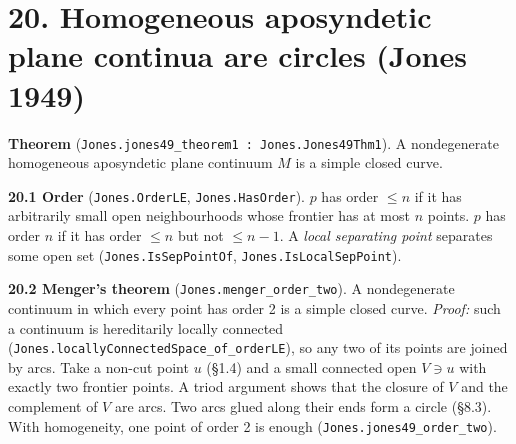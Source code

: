 \documentclass[11pt]{article}
\newcommand{\lean}[1]{\texttt{#1}}
\begin{document}
\section*{20. Homogeneous aposyndetic plane continua are circles (Jones 1949)}

\textbf{Theorem} (\lean{Jones.\hspace{0pt}jones49\_\hspace{0pt}theorem1 : Jones.\hspace{0pt}Jones49Thm1}). A nondegenerate homogeneous aposyndetic plane continuum $M$ is a simple closed curve.

\textbf{20.1 Order} (\lean{Jones.\hspace{0pt}OrderLE}, \lean{Jones.\hspace{0pt}HasOrder}). $p$ has order $\leq n$ if it has arbitrarily small open neighbourhoods whose frontier has at most $n$ points. $p$ has order $n$ if it has order $\leq n$ but not $\leq n - 1$. A \emph{local separating point} separates some open set (\lean{Jones.\hspace{0pt}IsSepPointOf}, \lean{Jones.\hspace{0pt}IsLocalSepPoint}).

\textbf{20.2 Menger's theorem} (\lean{Jones.\hspace{0pt}menger\_\hspace{0pt}order\_\hspace{0pt}two}). A nondegenerate continuum in which every point has order 2 is a simple closed curve. \emph{Proof:} such a continuum is hereditarily locally connected (\lean{Jones.\hspace{0pt}locallyConnectedSpace\_\hspace{0pt}of\_\hspace{0pt}orderLE}), so any two of its points are joined by arcs. Take a non-cut point $u$ (\S{}1.4) and a small connected open $V \ni u$ with exactly two frontier points. A triod argument shows that the closure of $V$ and the complement of $V$ are arcs. Two arcs glued along their ends form a circle (\S{}8.3). With homogeneity, one point of order 2 is enough (\lean{Jones.\hspace{0pt}jones49\_\hspace{0pt}order\_\hspace{0pt}two}).
\end{document}
